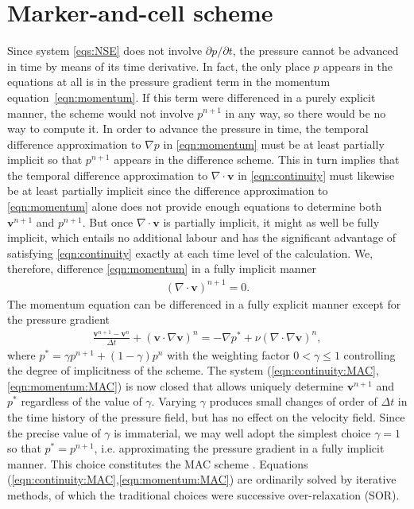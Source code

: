 \documentclass{article}
\begin{document}
\section{Marker-and-cell scheme}\label{sec:marker-and-cell-scheme}

Since system \eqref{eqs:NSE} does not involve $\partial p / \partial t$, the pressure cannot be advanced in time by means of its time derivative. In fact, the only place $p$ appears in the equations at all is in the pressure gradient term in the momentum equation~\eqref{eqn:momentum}. If this term were differenced in a purely explicit manner, the scheme would not involve $p^{n+1}$ in any way, so there would be no way to compute it. In order to advance the pressure in time, the temporal difference approximation to $\nabla p$ in \eqref{eqn:momentum} must be at least partially implicit so that $p^{n+1}$ appears in the difference scheme. This in turn implies that the temporal difference approximation to $\nabla \cdot \boldsymbol{v}$ in \eqref{eqn:continuity} must likewise be at least partially implicit since the difference
approximation to \eqref{eqn:momentum} alone does not provide enough equations to determine both $\boldsymbol{v}^{n+1}$ and $p^{n+1}$. But once $\nabla \cdot \boldsymbol{v}$ is partially implicit, it might as well be fully implicit, which entails no additional labour and has the significant advantage of satisfying \eqref{eqn:continuity} exactly at each time level
of the calculation. We, therefore, difference \eqref{eqn:momentum} in a fully implicit manner
\begin{align}
\label{eqn:continuity:MAC}
\left(\nabla \cdot \boldsymbol{v}\right)^{n+1} = 0.
\end{align}
The momentum equation can be differenced in a fully explicit manner except for the pressure gradient
\begin{align}
\label{eqn:momentum:MAC}
\frac{\boldsymbol{v}^{n+1}-\boldsymbol{v}^{n}}{\Delta t} + \left(\boldsymbol{v} \cdot \nabla \boldsymbol{v}\right)^{n} = - \nabla p^{*} + \nu \left(\nabla \cdot \nabla \boldsymbol{v}\right)^{n},
\end{align}
where $p^{*} = \gamma p^{n+1} + (1-\gamma) p^{n}$ with the weighting factor $0 < \gamma \le 1$ controlling the degree of implicitness of the scheme. The system (\eqref{eqn:continuity:MAC},\eqref{eqn:momentum:MAC}) is now closed that allows uniquely determine $\boldsymbol{v}^{n+1}$ and $p^{*}$ regardless of the value of $\gamma$. Varying $\gamma$ produces small changes of order of $\Delta t$ in the time history of the pressure field, but has no effect on the velocity field. Since the precise value of $\gamma$ is immaterial, we may well adopt the simplest choice $\gamma=1$ so that $p^{*}=p^{n+1}$, i.e. approximating the pressure gradient in a fully implicit manner. This choice constitutes the MAC scheme \cite{Harlow:1965}. Equations (\eqref{eqn:continuity:MAC},\eqref{eqn:momentum:MAC}) are ordinarily solved by iterative methods, of which the traditional choices were successive over-relaxation (SOR).
\end{document}
